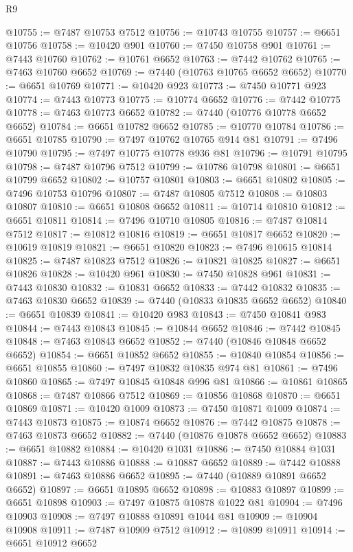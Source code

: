 \begin{lexlean}{R9}
\begin{coremodule}
{{{{{{{{{{{{{{{{{{{{{{{{{{{{{{{{{{{{{{{{{{{{{{{{{{{{{{{{{{{{{{{{{{{{{{{{{{{{{{{{{{{{@10755 := @7487 @10753 @7512
@10756 := @10743 @10755
@10757 := @6651 @10756
@10758 := @10420 @901
@10760 := @7450 @10758 @901
@10761 := @7443 @10760
@10762 := @10761 @6652
@10763 := @7442 @10762
@10765 := @7463 @10760 @6652
@10769 := @7440 (@10763 @10765 @6652 @6652)
@10770 := @6651 @10769
@10771 := @10420 @923
@10773 := @7450 @10771 @923
@10774 := @7443 @10773
@10775 := @10774 @6652
@10776 := @7442 @10775
@10778 := @7463 @10773 @6652
@10782 := @7440 (@10776 @10778 @6652 @6652)
@10784 := @6651 @10782 @6652
@10785 := @10770 @10784
@10786 := @6651 @10785
@10790 := @7497 @10762 @10765 @914 @81
@10791 := @7496 @10790
@10795 := @7497 @10775 @10778 @936 @81
@10796 := @10791 @10795
@10798 := @7487 @10796 @7512
@10799 := @10786 @10798
@10801 := @6651 @10799 @6652
@10802 := @10757 @10801
@10803 := @6651 @10802
@10805 := @7496 @10753 @10796
@10807 := @7487 @10805 @7512
@10808 := @10803 @10807
@10810 := @6651 @10808 @6652
@10811 := @10714 @10810
@10812 := @6651 @10811
@10814 := @7496 @10710 @10805
@10816 := @7487 @10814 @7512
@10817 := @10812 @10816
@10819 := @6651 @10817 @6652
@10820 := @10619 @10819
@10821 := @6651 @10820
@10823 := @7496 @10615 @10814
@10825 := @7487 @10823 @7512
@10826 := @10821 @10825
@10827 := @6651 @10826
@10828 := @10420 @961
@10830 := @7450 @10828 @961
@10831 := @7443 @10830
@10832 := @10831 @6652
@10833 := @7442 @10832
@10835 := @7463 @10830 @6652
@10839 := @7440 (@10833 @10835 @6652 @6652)
@10840 := @6651 @10839
@10841 := @10420 @983
@10843 := @7450 @10841 @983
@10844 := @7443 @10843
@10845 := @10844 @6652
@10846 := @7442 @10845
@10848 := @7463 @10843 @6652
@10852 := @7440 (@10846 @10848 @6652 @6652)
@10854 := @6651 @10852 @6652
@10855 := @10840 @10854
@10856 := @6651 @10855
@10860 := @7497 @10832 @10835 @974 @81
@10861 := @7496 @10860
@10865 := @7497 @10845 @10848 @996 @81
@10866 := @10861 @10865
@10868 := @7487 @10866 @7512
@10869 := @10856 @10868
@10870 := @6651 @10869
@10871 := @10420 @1009
@10873 := @7450 @10871 @1009
@10874 := @7443 @10873
@10875 := @10874 @6652
@10876 := @7442 @10875
@10878 := @7463 @10873 @6652
@10882 := @7440 (@10876 @10878 @6652 @6652)
@10883 := @6651 @10882
@10884 := @10420 @1031
@10886 := @7450 @10884 @1031
@10887 := @7443 @10886
@10888 := @10887 @6652
@10889 := @7442 @10888
@10891 := @7463 @10886 @6652
@10895 := @7440 (@10889 @10891 @6652 @6652)
@10897 := @6651 @10895 @6652
@10898 := @10883 @10897
@10899 := @6651 @10898
@10903 := @7497 @10875 @10878 @1022 @81
@10904 := @7496 @10903
@10908 := @7497 @10888 @10891 @1044 @81
@10909 := @10904 @10908
@10911 := @7487 @10909 @7512
@10912 := @10899 @10911
@10914 := @6651 @10912 @6652
}}}}}}}}}}}}}}}}}}}}}}}}}}}}}}}}}}}}}}}}}}}}}}}}}}}}}}}}}}}}}}}}}}}}}}}}}}}}}}}}}}}}
\end{coremodule}
\end{lexlean}
